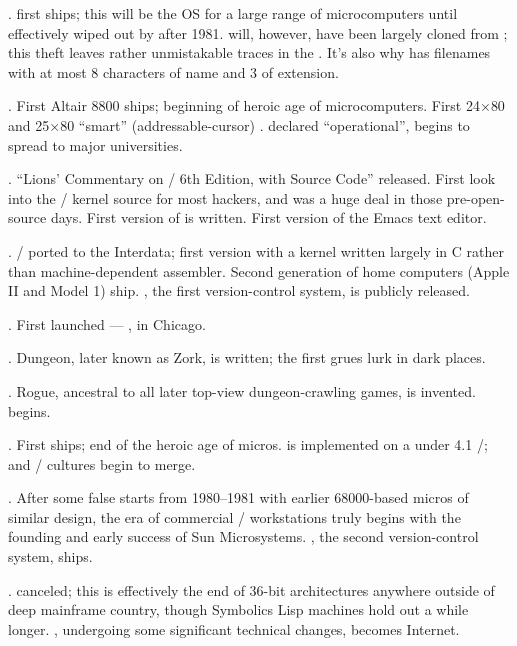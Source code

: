 .
 first ships; this will be the OS for a large range of microcomputers until
effectively wiped out by  after 1981.  will, however, have been
largely cloned from ; this theft leaves rather unmistakable traces in the
. It's also why  has filenames with at most 8 characters of name and
3 of extension.

.
First Altair 8800 ships; beginning of heroic age of microcomputers. First 24$\times$80
and 25$\times$80 ``smart'' (addressable-cursor) .  declared ``operational'',
begins to spread to major universities.

.
``Lions' Commentary on \UNIX/ 6th Edition, with Source Code'' released. First look
into the \UNIX/ kernel source for most hackers, and was a huge deal in those
pre-open-source days. First version of  is written. First version of the
Emacs text editor.

.
\UNIX/ ported to the Interdata; first version with a kernel written largely in C
rather than machine-dependent assembler. Second generation of home computers
(Apple II and  Model 1) ship. , the first version-control system, is
publicly released.

.
First  launched --- , in Chicago.

.
 Dungeon, later known as Zork, is written; the first grues lurk in dark
places.

.
Rogue, ancestral to all later top-view dungeon-crawling games, is invented.
 begins.

.
First  ships; end of the heroic age of micros.  is implemented on a
 under 4.1 \UNIX/;  and \UNIX/ cultures begin to merge.

.
After some false starts from 1980--1981 with earlier 68000-based micros of
similar design, the era of commercial \UNIX/ workstations truly begins with the
founding and early success of Sun Microsystems. , the second version-control
system, ships.

.
 canceled; this is effectively the end of 36-bit architectures anywhere
outside of deep mainframe country, though Symbolics Lisp machines hold out a
while longer. , undergoing some significant technical changes, becomes
Internet.


